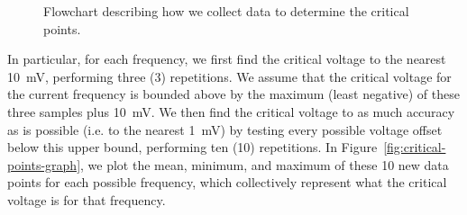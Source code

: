 \begin{figure}[!htb]
    \caption{
        \label{fig:data-collection-flowchart}
        Flowchart describing how we collect data to determine the critical
        points.
    }
\end{figure}

In particular, for each frequency, we first find the critical voltage to the
nearest 10~mV, performing three (3) repetitions. We assume that the critical
voltage for the current frequency is bounded above by the maximum (least
negative) of these three samples plus 10~mV. We then find the critical voltage
to as much accuracy as is possible (i.e. to the nearest 1~mV) by testing every
possible voltage offset below this upper bound, performing ten (10) repetitions.
In Figure~\ref{fig:critical-points-graph}, we plot the mean, minimum, and
maximum of these 10 new data points for each possible frequency, which
collectively represent what the critical voltage is for that frequency.


